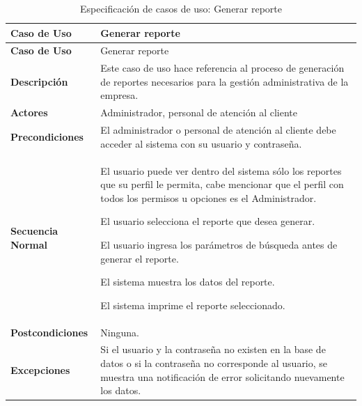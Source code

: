 	\endgroup 
	\vspace{-6pt}  %
	
	\begingroup
	\onehalfspacing
	
	\begin{longtable}{m{4cm} m{10.5cm}}
		\caption[Especificación de casos de uso: Generar reporte]{\newline Especificación de casos de uso: Generar reporte} \label{tab:tabla3_10}\\
		\toprule
		\textbf{Caso de Uso} & Generar reporte \\
		\midrule
		\endfirsthead
		
		\toprule
		\textbf{Caso de Uso} & Generar reporte \\
		\endhead
		
		
		\bottomrule
		\endlastfoot
		
		\textbf{Descripción} & Este caso de uso hace referencia al proceso de generación de reportes necesarios para la gestión administrativa de la empresa. \\ \hline
		\textbf{Actores} & Administrador, personal de atención al cliente \\ \hline
		\textbf{Precondiciones} & El administrador o personal de atención al cliente debe acceder al sistema con su usuario y contraseña. \\ \hline
		\textbf{Secuencia Normal} & El usuario puede ver dentro del sistema sólo los reportes que su perfil le permita, cabe mencionar que el perfil con todos los
		permisos u opciones es el Administrador.
		
		El usuario selecciona el reporte que desea generar.
		
		El usuario ingresa los parámetros de búsqueda antes de generar el reporte.
		
		El sistema muestra los datos del reporte.
		
		El sistema imprime el reporte seleccionado. \\ \hline
		\textbf{Postcondiciones} & Ninguna.\\ \hline
		\textbf{Excepciones} & Si el usuario y la contraseña no existen en la base de datos o si la contraseña no corresponde al usuario, se muestra una notificación de error solicitando nuevamente los datos. \\		
	\end{longtable}
	
